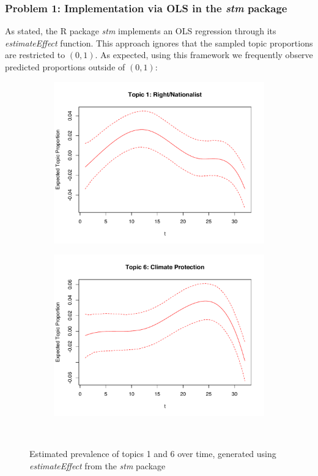 \subsubsection{Problem 1: Implementation via OLS in the \textit{stm} package}

\noindent As stated, the R package \textit{stm} implements an OLS regression through its \textit{estimateEffect} function. This approach ignores that the sampled topic proportions are restricted to $(0,1)$. As expected, using this framework we frequently observe predicted proportions outside of $(0,1)$:\\

\begin{figure}[h!]
  \centering
  \captionsetup{justification=centering,margin=2cm}
  \begin{subfigure}[b]{0.4\linewidth}
    \includegraphics[width=\linewidth]{../plots/5_1/estEffect_topic1.pdf}
  \end{subfigure}
  \begin{subfigure}[b]{0.4\linewidth}
    \includegraphics[width=\linewidth]{../plots/5_1/estEffect_topic6.pdf}
  \end{subfigure}\\
  \caption{Estimated prevalence of topics 1 and 6 over time, generated using \textit{estimateEffect} from the \textit{stm} package}
  \label{fig:estEffect_topic16}
\end{figure}
